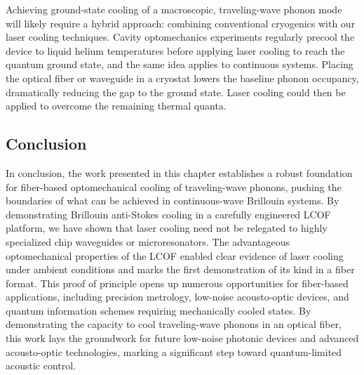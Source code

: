 Achieving ground-state cooling of a macroscopic, traveling-wave phonon mode will likely require a hybrid approach: combining conventional cryogenics with our laser cooling techniques. Cavity optomechanics experiments regularly precool the device to liquid helium temperatures before applying laser cooling to reach the quantum ground state, \cite{doeleman2023brillouin} and the same idea applies to continuous systems. Placing the optical fiber or waveguide in a cryostat lowers the baseline phonon occupancy, dramatically reducing the gap to the ground state. Laser cooling could then be applied to overcome the remaining thermal quanta.

\subsection{Conclusion}
\label{Cooling:subsec:Conclusion}

In conclusion, the work presented in this chapter establishes a robust foundation for fiber-based optomechanical cooling of traveling-wave phonons, pushing the boundaries of what can be achieved in continuous-wave Brillouin systems. By demonstrating Brillouin anti-Stokes cooling in a carefully engineered \ac{LCOF} platform, we have shown that laser cooling need not be relegated to highly specialized chip waveguides or microresonators. The advantageous optomechanical properties of the \ac{LCOF} enabled clear evidence of laser cooling under ambient conditions and marks the first demonstration of its kind in a fiber format. This proof of principle opens up numerous opportunities for fiber-based applications, including precision metrology, low-noise acousto-optic devices, and quantum information schemes requiring mechanically cooled states. By demonstrating the capacity to cool traveling-wave phonons in an optical fiber, this work lays the groundwork for future low-noise photonic devices and advanced acousto-optic technologies, marking a significant step toward quantum-limited acoustic control.

\clearpage
\thispagestyle{empty}
\null
\newpage
